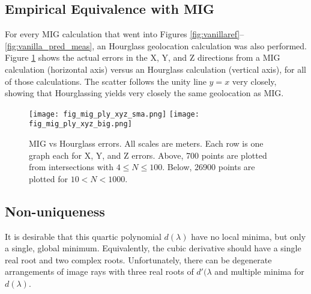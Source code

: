 \documentclass[10pt]{amsart}
\begin{document}
\subsection{Empirical Equivalence with MIG}
For every MIG calculation that went into Figures
\ref{fig:vanillaref}--\ref{fig:vanilla_pred_meas}, an Hourglass geolocation
calculation was also performed. Figure \ref{fig:mig_vs_hourglass} shows the
actual errors in the X, Y, and Z directions from a MIG calculation (horizontal
axis) versus an Hourglass calculation (vertical axis), for all of those
calculations. The scatter follows the unity line $y=x$ very closely, showing
that Hourglassing yields very closely the same geolocation as MIG.

\begin{figure}
\texttt{[image: fig\_mig\_ply\_xyz\_sma.png]}
\texttt{[image: fig\_mig\_ply\_xyz\_big.png]}
\caption{\label{fig:mig_vs_hourglass}MIG vs Hourglass errors. All scales are
  meters. Each row is one graph each for X, Y, and Z errors. Above, 700 points
  are plotted from intersections with $4\le N\le 100$. Below, 26900 points are
  plotted for $10<N<1000$.}
\end{figure}


\subsection{Non-uniqueness}
It is desirable that this quartic polynomial $d(\lambda)$ have no
local minima, but only a single, global minimum. Equivalently, the
cubic derivative should have a single real root and two complex
roots. Unfortunately, there can be degenerate arrangements of image
rays with three real roots of $d'(\lambda$ and multiple minima for
$d(\lambda)$.

\end{document}
